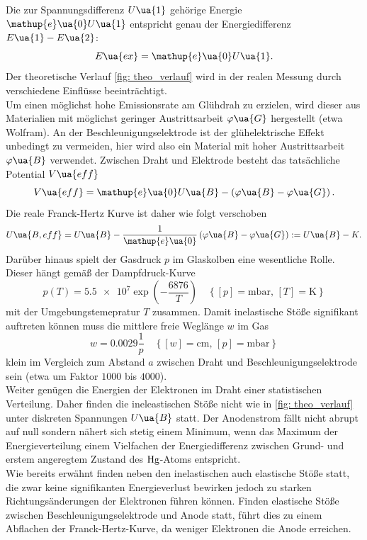 Die zur Spannungsdifferenz $U\ua{1}$ gehörige
Energie $\mathup{e}\ua{0}U\ua{1}$ entspricht genau der Energiedifferenz $E\ua{1} - E\ua{2}$:
\begin{equation}
  \label{eq: anregungsenergie}
  E\ua{ex} = \mathup{e}\ua{0}U\ua{1}.
\end{equation}
Der theoretische
Verlauf \ref{fig: theo_verlauf} wird in der realen Messung durch verschiedene Einflüsse beeinträchtigt. \\
Um einen möglichst hohe Emissionsrate am Glühdrah zu erzielen, wird dieser aus Materialien mit möglichst geringer Austrittsarbeit $\varphi\ua{G}$
hergestellt (etwa Wolfram). An der Beschleunigungselektrode ist der glühelektrische Effekt unbedingt zu vermeiden, hier wird also
ein Material mit hoher Austrittsarbeit $\varphi\ua{B}$ verwendet. Zwischen Draht und Elektrode besteht das tatsächliche
Potential $V\ua{eff}$
\begin{equation}
  V\ua{eff} = \mathup{e}\ua{0} U\ua{B} - \left(\varphi\ua{B} - \varphi\ua{G}  \right).
\end{equation}
Die reale Franck-Hertz Kurve ist daher wie folgt verschoben
\begin{equation}
  \label{eq: effektivspannung}
  U\ua{B, eff} = U\ua{B} - \frac{1}{\mathup{e}\ua{0}}\left(\varphi\ua{B} - \varphi\ua{G}  \right) := U\ua{B}  - K.
\end{equation}
Darüber hinaus spielt der Gasdruck $p$ im Glaskolben eine wesentliche Rolle. Dieser hängt gemäß der Dampfdruck-Kurve
\begin{equation}
  \label{eq: dampfdruck}
  p(T) = \num{5.5e7}\exp \left( -\frac{6876}{T} \right) \quad \left\{[p] = \si{\milli\bar}, \, [T] = \si{\kelvin}\right\}
\end{equation}
mit der Umgebungstemepratur $T$ zusammen. Damit inelastische Stöße signifikant auftreten können muss die mittlere
freie Weglänge $w$ im Gas
\begin{equation}
  \label{eq: weglaenge}
  w = 0.0029 \frac{1}{p} \quad \left\{[w] = \si{\centi\meter}, \, [p] = \si{\milli\bar} \right\}
\end{equation}
klein im Vergleich zum Abstand $a$ zwischen Draht und Beschleunigungselektrode sein (etwa um Faktor $1000$ bis $4000$). \\
Weiter genügen die Energien der Elektronen im Draht einer statistischen Verteilung. Daher finden die ineleastischen
Stöße nicht wie in \ref{fig: theo_verlauf} unter diskreten Spannungen $U\ua{B}$ statt. Der Anodenstrom fällt nicht abrupt
auf null sondern nähert sich stetig einem Minimum, wenn das Maximum der Energieverteilung einem Vielfachen der Energiedifferenz
zwischen Grund- und erstem angeregtem Zustand des $\ce{Hg}$-Atoms entspricht. \\
Wie bereits erwähnt finden neben den inelastischen auch elastische Stöße statt, die zwar keine signifikanten Energieverlust
bewirken jedoch zu starken Richtungsänderungen der Elektronen führen können. Finden elastische Stöße zwischen Beschleunigungselektrode
und Anode statt, führt dies zu einem Abflachen der Franck-Hertz-Kurve, da weniger Elektronen die Anode erreichen.
